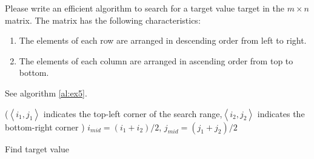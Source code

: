 \begin{exercise}[]{Please write an efficient algorithm to search for a target value target in the $m \times n$ matrix. The matrix has the following characteristics:
    \begin{enumerate}
    \item
    The elements of each row are arranged in descending order from left to right.
    \item
    The elements of each column are arranged in ascending order from top to bottom.
    \end{enumerate}}
  \begin{solution}
  See algorithm \ref{al:ex5}.

  \begin{algorithm}[H]
    \BlankLine

    \Fn($\left\langle i_1, j_1 \right\rangle$ indicates the top-left corner of the search range,$\left\langle i_2, j_2 \right\rangle$ indicates the bottom-right corner ){}{
        $i_{mid} = (i_1 + i_2)/2$,       $j_{mid} = (j_1 + j_2)/2$\;
    }

    \caption{Find target value \label{al:ex5}}
  \end{algorithm}
  \end{solution}
  \label{ex5}
\end{exercise}


